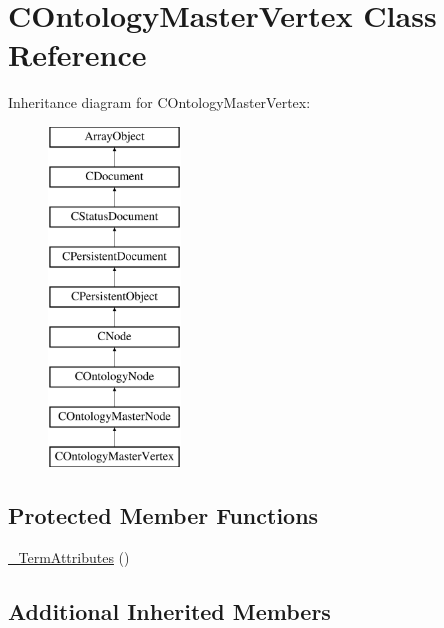 \hypertarget{class_c_ontology_master_vertex}{\section{C\-Ontology\-Master\-Vertex Class Reference}
\label{class_c_ontology_master_vertex}
}
Inheritance diagram for C\-Ontology\-Master\-Vertex\-:\begin{figure}[H]
\begin{center}
\leavevmode
\includegraphics[height=9.000000cm]{class_c_ontology_master_vertex}
\end{center}
\end{figure}
\subsection*{Protected Member Functions}
\begin{DoxyCompactItemize}
\item 
\hyperlink{class_c_ontology_master_vertex_a054fdaa67952efb59dc30b47ceed8781}{\-\_\-\-Term\-Attributes} ()
\end{DoxyCompactItemize}
\subsection*{Additional Inherited Members}


